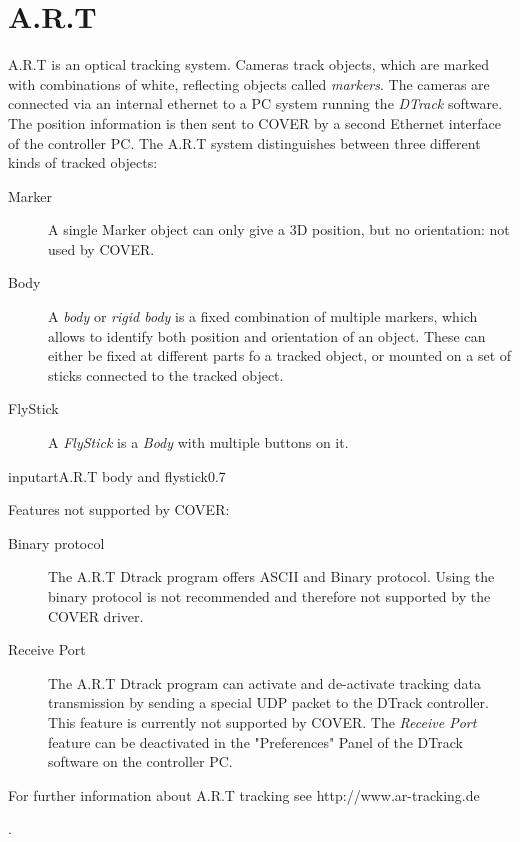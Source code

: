\section{A.R.T}
A.R.T is an optical tracking system. Cameras track objects, which are 
marked with combinations of white, reflecting objects called {\it markers}.
The cameras are connected via an internal ethernet to a PC system running 
the {\it DTrack} software. The position information is then sent to COVER 
by a second Ethernet interface of the controller PC. The A.R.T system 
distinguishes between three different kinds of tracked objects:

\begin{description}
\item[Marker]   A single Marker object can only give a 3D position, but no 
                orientation: not used by COVER.
\item[Body]     A {\it body} or {\it rigid body} is a fixed combination of
                multiple markers, which allows to identify both position and
                orientation of an object. These can either be fixed at different
                parts fo a tracked object, or mounted on a set of sticks connected
                to the tracked object.
\item[FlyStick] A {\it FlyStick} is a {\it Body} with multiple buttons on it. 
\end{description}

\begin{covimg}{input}{art}{A.R.T body and flystick}{0.7}\end{covimg}

Features not supported by COVER:

\begin{description}
\item[Binary protocol]
The A.R.T Dtrack program offers ASCII and Binary protocol. Using the binary protocol
is not recommended and therefore not supported by the COVER driver.
\item[Receive Port]
The A.R.T Dtrack program can activate and de-activate tracking data 
transmission by sending a special UDP packet to the DTrack controller.
This feature is currently not supported by COVER. The {\it Receive Port} 
feature can be deactivated in the "Preferences" Panel of the DTrack 
software on the controller PC.
\end{description}

For further information about A.R.T tracking see 
\latexonly http://www.ar-tracking.de \endlatexonly
\begin{htmlonly}
\end{htmlonly}.

